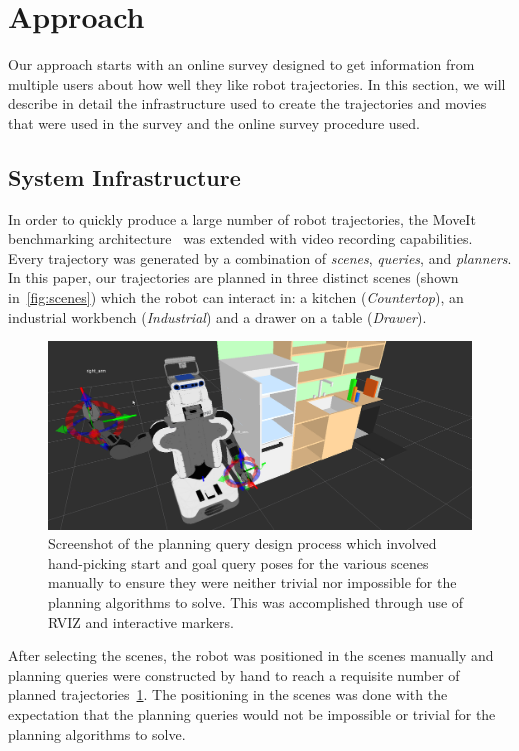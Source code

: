 \documentclass[letterpaper, 10 pt, conference]{ieeeconf}  %
\begin{document}
\section{Approach}
\label{sec:survey}
Our approach starts with an online survey designed to get information from multiple users about how well they like robot trajectories. In this section, we will describe in detail the infrastructure used to create the trajectories and movies that were used in the survey and the online 
survey procedure used. 

\subsection{System Infrastructure}

In order to quickly produce a large number of robot trajectories, the MoveIt benchmarking architecture~\cite{cohen2012generic} was extended with video recording capabilities. Every trajectory was generated by a combination of \emph{scenes}, \emph{queries}, and \emph{planners}. In this paper, our trajectories are planned in three distinct scenes (shown in~\ref{fig:scenes}) which the robot can interact in: a kitchen (\emph{Countertop}), an industrial workbench (\emph{Industrial}) and a drawer on a table (\emph{Drawer}).

\begin{figure}[b]
    \includegraphics[trim = 0mm 0mm 0mm 0mm, width=\columnwidth]{pictures/designing_queries_moveit}
    \caption{Screenshot of the planning query design process which involved hand-picking start and goal query poses for the various scenes manually to ensure they were neither trivial nor impossible for the planning algorithms to solve. This was accomplished through use of RVIZ and interactive markers.}
    \label{fig:design}
\end{figure}

After selecting the scenes, the robot was positioned in the scenes manually and planning queries were constructed by hand to reach a requisite number of planned trajectories~\ref{fig:design}. The positioning in the scenes was done with the expectation that the planning queries would not be impossible or trivial for the planning algorithms to solve. 
\end{document}
